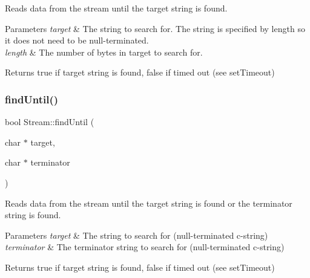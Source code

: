 Reads data from the stream until the target string is found. 


\begin{DoxyParams}{Parameters}
{\em target} & The string to search for. The string is specified by length so it does not need to be null-\/terminated.\\
\hline
{\em length} & The number of bytes in target to search for.\\
\hline
\end{DoxyParams}
\begin{DoxyReturn}{Returns}
true if target string is found, false if timed out (see set\+Timeout) 
\end{DoxyReturn}
\mbox{\label{class_stream_ad1f5f6600832396fb38a897baf4de35b}} 
\subsubsection{\texorpdfstring{find\+Until()}{findUntil()}\hspace{0.1cm}{\footnotesize\ttfamily [1/2]}}
{\footnotesize\ttfamily bool Stream\+::find\+Until (\begin{DoxyParamCaption}\item[{char $\ast$}]{target,  }\item[{char $\ast$}]{terminator }\end{DoxyParamCaption})}



Reads data from the stream until the target string is found or the terminator string is found. 


\begin{DoxyParams}{Parameters}
{\em target} & The string to search for (null-\/terminated c-\/string)\\
\hline
{\em terminator} & The terminator string to search for (null-\/terminated c-\/string)\\
\hline
\end{DoxyParams}
\begin{DoxyReturn}{Returns}
true if target string is found, false if timed out (see set\+Timeout) 
\end{DoxyReturn}
\mbox{\label{class_stream_a3a9497de614792103ab8cb4759e01a69}} 
